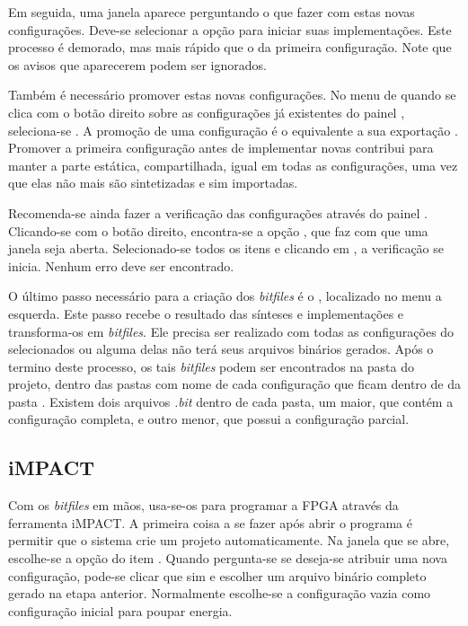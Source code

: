 \documentclass[11pt,a4paper,oneside]{book}
\begin{document}
Em seguida, uma janela aparece perguntando o que fazer com estas novas configurações.
Deve-se selecionar a opção  para iniciar suas implementações.
Este processo é demorado, mas mais rápido que o da primeira configuração.
Note que os avisos que aparecerem podem ser ignorados.

Também é necessário promover estas novas configurações.
No menu de quando se clica com o botão direito sobre as configurações já existentes do painel , seleciona-se .
A promoção de uma configuração é o equivalente a sua exportação \cite{ug748}.
Promover a primeira configuração antes de implementar novas contribui para manter a parte estática, compartilhada, igual em todas as configurações, uma vez que elas não mais são sintetizadas e sim importadas.

Recomenda-se ainda fazer a verificação das configurações através do painel .
Clicando-se com o botão direito, encontra-se a opção , que faz com que uma janela seja aberta.
Selecionado-se todos os itens e clicando em , a verificação se inicia.
Nenhum erro deve ser encontrado.

O último passo necessário para a criação dos \textit{bitfiles} é o , localizado no menu a esquerda.
Este passo recebe o resultado das sínteses e implementações e transforma-os em \textit{bitfiles}.
Ele precisa ser realizado com todas as configurações do  selecionados ou alguma delas não terá seus arquivos binários gerados.
Após o termino deste processo, os tais \textit{bitfiles} podem ser encontrados na pasta do projeto, dentro das pastas com nome de cada configuração que ficam dentro de da pasta .
Existem dois arquivos \textit{.bit} dentro de cada pasta, um maior, que contém a configuração completa, e outro menor, que possui a configuração parcial.

\subsection{iMPACT}
Com os \textit{bitfiles} em mãos, usa-se-os para programar a FPGA através da ferramenta iMPACT. 
A primeira coisa a se fazer após abrir o programa é permitir que o sistema crie um projeto automaticamente.
Na janela que se abre, escolhe-se a opção  do item .
Quando pergunta-se se deseja-se atribuir uma nova configuração, pode-se clicar que sim e escolher um arquivo binário completo gerado na etapa anterior.
Normalmente escolhe-se a configuração vazia como configuração inicial para poupar energia.
\end{document}
